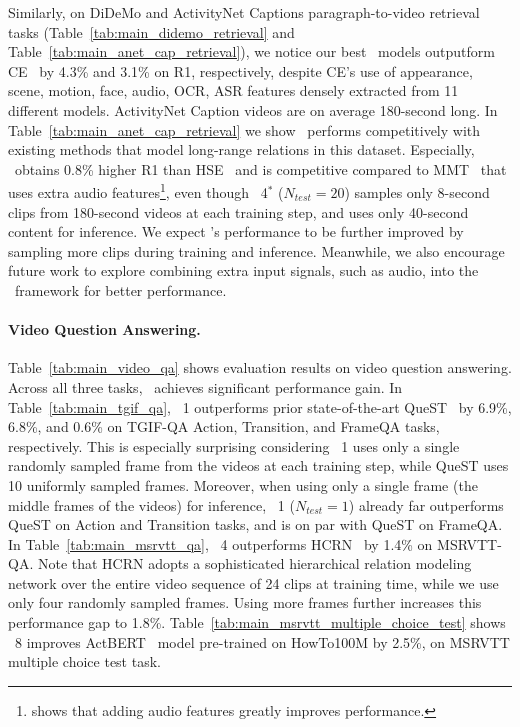 Similarly, on DiDeMo and ActivityNet Captions paragraph-to-video retrieval tasks (Table~\ref{tab:main_didemo_retrieval} and Table~\ref{tab:main_anet_cap_retrieval}), we notice our best \ModelName~models outputform CE~\cite{liu2019use} by 4.3\% and 3.1\% on R1, respectively, despite CE's use of appearance, scene, motion, face, audio, OCR, ASR features densely extracted from 11 different models.
ActivityNet Caption videos are on average 180-second long. 
In Table~\ref{tab:main_anet_cap_retrieval} we show \ModelName~performs competitively with existing methods that model long-range relations in this dataset. 
Especially, \ModelName~obtains 0.8\% higher R1 than HSE~\cite{zhang2018cross} and is competitive compared to MMT~\cite{gabeur2020multi} that uses extra audio features\footnote{\cite{gabeur2020multi} shows that adding audio features greatly improves performance.}, even though \ModelName~4$^*$ ($N_{test}{=}20$) samples only 8-second clips from 180-second videos at each training step, and uses only 40-second content for inference.
We expect \ModelName's performance to be further improved by sampling more clips during training and inference.
Meanwhile, we also encourage future work to explore combining extra input signals, such as audio, into the \ModelName~framework for better performance.

\paragraph{Video Question Answering.}
Table~\ref{tab:main_video_qa} shows evaluation results on video question answering. 
Across all three tasks, \ModelName~achieves significant performance gain.
In Table~\ref{tab:main_tgif_qa}, \ModelName~1 outperforms prior state-of-the-art QueST~\cite{jiang2020divide} by 6.9\%, 6.8\%, and 0.6\% on TGIF-QA Action, Transition, and FrameQA tasks, respectively.
This is especially surprising considering \ModelName~1 uses only a single randomly sampled frame from the videos at each training step, while QueST uses 10 uniformly sampled frames.
Moreover, when using only a single frame (the middle frames of the videos) for inference, \ModelName~1 ($N_{test}{=}1$) already far outperforms QueST on Action and Transition tasks, and is on par with QueST on FrameQA.
In Table~\ref{tab:main_msrvtt_qa}, \ModelName~4 outperforms HCRN~\cite{le2020hierarchical} by 1.4\% on MSRVTT-QA.
Note that HCRN adopts a sophisticated hierarchical relation modeling network over the entire video sequence of 24 clips at training time, while we use only four randomly sampled frames. 
Using more frames further increases this performance gap to 1.8\%.
Table~\ref{tab:main_msrvtt_multiple_choice_test} shows \ModelName~8 improves ActBERT~\cite{zhu2020actbert} model pre-trained on HowTo100M by 2.5\%, on MSRVTT multiple choice test task.
